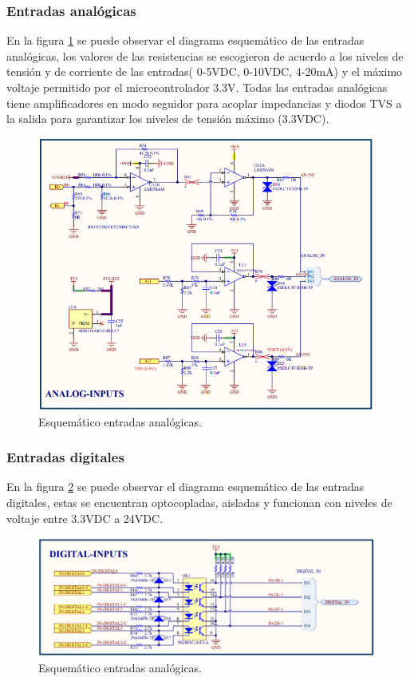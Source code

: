 \subsubsection{Entradas analógicas}

En la figura \ref{fig:inputanalog} se puede observar el diagrama esquemático de las entradas analógicas, los valores de las resistencias se escogieron de acuerdo a los niveles de tensión y de corriente de las entradas( 0-5VDC, 0-10VDC, 4-20mA) y el máximo voltaje permitido por el microcontrolador 3.3V. Todas las entradas analógicas tiene amplificadores en modo seguidor para acoplar impedancias y diodos TVS a la salida para garantizar los niveles de tensión máximo (3.3VDC).

\begin{figure}[h]
	\centering
	\includegraphics[scale=.65]{./Figures/inputanalog.PNG}
	\caption{Esquemático entradas analógicas.}
	\label{fig:inputanalog}
\end{figure}

\subsubsection{Entradas digitales}

En la figura \ref{fig:digitalinputs} se puede observar el diagrama esquemático de las entradas digitales, estas se encuentran optocopladas, aisladas y funcionan con niveles de voltaje entre 3.3VDC a 24VDC.

\begin{figure}[h]
	\centering
	\includegraphics[scale=.45]{./Figures/digitalinputs.PNG}
	\caption{Esquemático entradas analógicas.}
	\label{fig:digitalinputs}
\end{figure}

